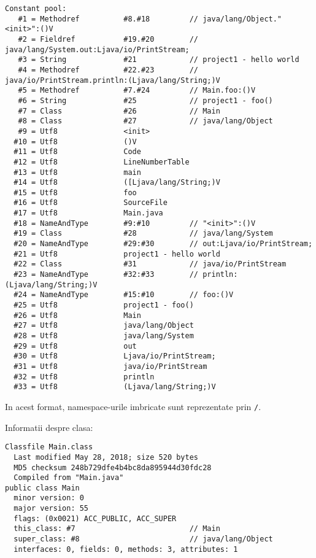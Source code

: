 \documentclass[]{article}
\begin{document}
\begin{verbatim}
Constant pool:
   #1 = Methodref          #8.#18         // java/lang/Object."<init>":()V
   #2 = Fieldref           #19.#20        // java/lang/System.out:Ljava/io/PrintStream;
   #3 = String             #21            // project1 - hello world
   #4 = Methodref          #22.#23        // java/io/PrintStream.println:(Ljava/lang/String;)V
   #5 = Methodref          #7.#24         // Main.foo:()V
   #6 = String             #25            // project1 - foo()
   #7 = Class              #26            // Main
   #8 = Class              #27            // java/lang/Object
   #9 = Utf8               <init>
  #10 = Utf8               ()V
  #11 = Utf8               Code
  #12 = Utf8               LineNumberTable
  #13 = Utf8               main
  #14 = Utf8               ([Ljava/lang/String;)V
  #15 = Utf8               foo
  #16 = Utf8               SourceFile
  #17 = Utf8               Main.java
  #18 = NameAndType        #9:#10         // "<init>":()V
  #19 = Class              #28            // java/lang/System
  #20 = NameAndType        #29:#30        // out:Ljava/io/PrintStream;
  #21 = Utf8               project1 - hello world
  #22 = Class              #31            // java/io/PrintStream
  #23 = NameAndType        #32:#33        // println:(Ljava/lang/String;)V
  #24 = NameAndType        #15:#10        // foo:()V
  #25 = Utf8               project1 - foo()
  #26 = Utf8               Main
  #27 = Utf8               java/lang/Object
  #28 = Utf8               java/lang/System
  #29 = Utf8               out
  #30 = Utf8               Ljava/io/PrintStream;
  #31 = Utf8               java/io/PrintStream
  #32 = Utf8               println
  #33 = Utf8               (Ljava/lang/String;)V
\end{verbatim}

In acest format, namespace-urile imbricate sunt reprezentate prin
\texttt{/}.

Informatii despre clasa:

\begin{verbatim}
Classfile Main.class
  Last modified May 28, 2018; size 520 bytes
  MD5 checksum 248b729dfe4b4bc8da895944d30fdc28
  Compiled from "Main.java"
public class Main
  minor version: 0
  major version: 55
  flags: (0x0021) ACC_PUBLIC, ACC_SUPER
  this_class: #7                          // Main
  super_class: #8                         // java/lang/Object
  interfaces: 0, fields: 0, methods: 3, attributes: 1
\end{verbatim}
\end{document}
